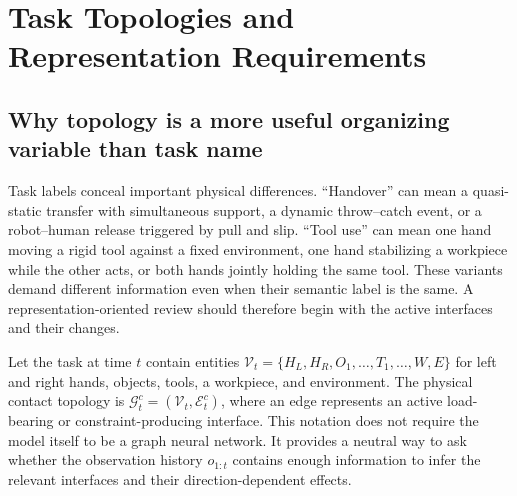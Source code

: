 \section{Task Topologies and Representation Requirements}
\label{sec:topologies}

\subsection{Why topology is a more useful organizing variable than task name}

Task labels conceal important physical differences. ``Handover'' can mean a
quasi-static transfer with simultaneous support, a dynamic throw--catch event,
or a robot--human release triggered by pull and slip. ``Tool use'' can mean one
hand moving a rigid tool against a fixed environment, one hand stabilizing a
workpiece while the other acts, or both hands jointly holding the same tool.
These variants demand different information even when their semantic label is
the same. A representation-oriented review should therefore begin with the
active interfaces and their changes.

Let the task at time $t$ contain entities
$\mathcal{V}_t=\{H_L,H_R,O_1,\ldots,T_1,\ldots,W,E\}$ for left and right hands,
objects, tools, a workpiece, and environment. The physical contact topology is
$\mathcal{G}^{c}_t=(\mathcal{V}_t,\mathcal{E}^{c}_t)$, where an edge represents
an active load-bearing or constraint-producing interface. This notation does
not require the model itself to be a graph neural network. It provides a neutral
way to ask whether the observation history $o_{1:t}$ contains enough information
to infer the relevant interfaces and their direction-dependent effects.

